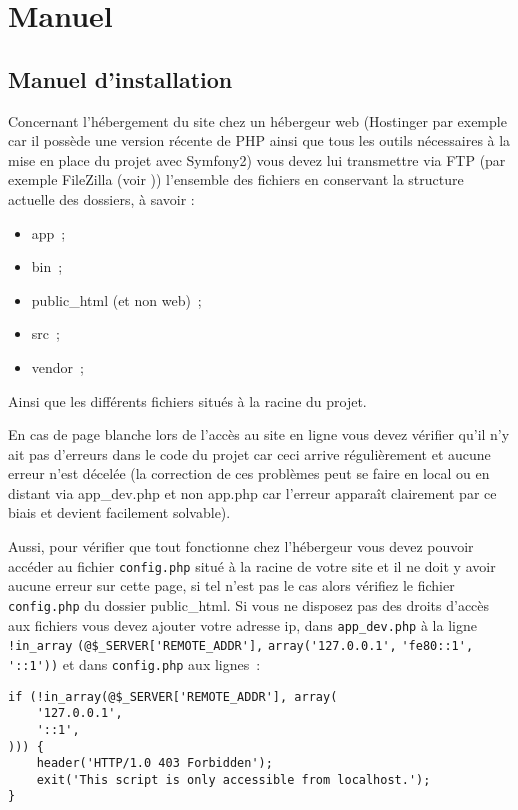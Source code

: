 \chapter{Manuel}

\section{Manuel d'installation}

Concernant l'hébergement du site chez un hébergeur web (Hostinger par exemple car il possède une version récente de PHP ainsi que tous les outils nécessaires à la mise en place du projet avec Symfony2) vous devez lui transmettre via FTP (par exemple FileZilla (voir \cite{fz})) l'ensemble des fichiers en conservant la structure actuelle des dossiers, à savoir :
\begin{itemize}
    \item app~;
    \item bin~;
    \item public\_html (et non web)~;
    \item src~;
    \item vendor~;
\end{itemize}
Ainsi que les différents fichiers situés à la racine du projet.

En cas de page blanche lors de l'accès au site en ligne vous devez vérifier qu'il n'y ait pas d'erreurs dans le code du projet car ceci arrive régulièrement et aucune erreur n'est décelée (la correction de ces problèmes peut se faire en local ou en distant via app\_dev.php et non app.php car l'erreur apparaît clairement par ce biais et devient facilement solvable).

Aussi, pour vérifier que tout fonctionne chez l'hébergeur vous devez pouvoir accéder au fichier \verb|config.php| situé à la racine de votre site et il ne doit y avoir aucune erreur sur cette page, si tel n'est pas le cas alors vérifiez le fichier \verb|config.php| du dossier public\_html. Si vous ne disposez pas des droits d'accès aux fichiers vous devez ajouter votre adresse ip, dans \verb|app_dev.php| à la ligne 
\verb|!in_array| \verb|(@$_SERVER['REMOTE_ADDR'],| \verb|array('127.0.0.1',| \verb|'fe80::1',| \verb|'::1'))| et dans \verb|config.php| aux lignes~:
\begin{lstlisting}
if (!in_array(@$_SERVER['REMOTE_ADDR'], array(
    '127.0.0.1',
    '::1',
))) {
    header('HTTP/1.0 403 Forbidden');
    exit('This script is only accessible from localhost.');
}
\end{lstlisting}

